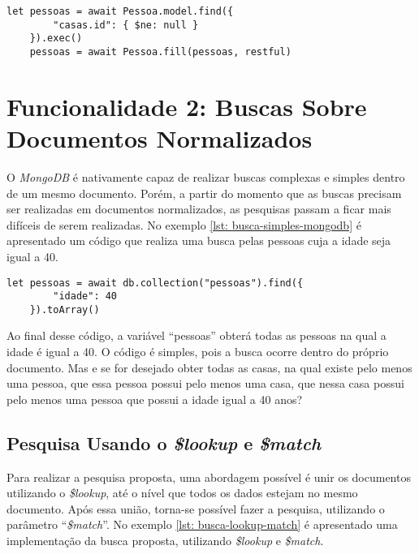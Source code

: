 \begin{lstlisting}[style=ES6, caption={\textit{inner join} de Documentos Com o \textit{Alpha Restful\label{lst: inner-join-alpha-restful}}}]
	let pessoas = await Pessoa.model.find({
	    "casas.id": { $ne: null }
	}).exec()
	pessoas = await Pessoa.fill(pessoas, restful)
\end{lstlisting}

\section{Funcionalidade 2: Buscas Sobre Documentos Normalizados\label{section: buscas-filtradas-documentos-relacionados}}

O \textit{MongoDB} é nativamente capaz de realizar buscas complexas e simples dentro de um mesmo documento. Porém, a partir do momento que as buscas precisam ser realizadas em documentos normalizados, as pesquisas passam a ficar mais difíceis de serem realizadas. No exemplo \ref{lst: busca-simples-mongodb} é apresentado um código que realiza uma busca pelas pessoas cuja a idade seja igual a 40.


\begin{lstlisting}[style=ES6, caption={Busca de Pessoas com Idade Igual a 40\label{lst: busca-simples-mongodb}}]
    let pessoas = await db.collection("pessoas").find({
        "idade": 40
    }).toArray()
\end{lstlisting}

Ao final desse código, a variável ``pessoas'' obterá todas as pessoas na qual a idade é igual a 40. O código é simples, pois a busca ocorre dentro do próprio documento. Mas e se for desejado obter todas as casas, na qual existe pelo menos uma pessoa, que essa pessoa possui pelo menos uma casa, que nessa casa possui pelo menos uma pessoa que possui a idade igual a 40 anos?

\subsection{Pesquisa Usando o \textit{\$lookup} e \textit{\$match}\label{subsection: pesquisa-lookup-match}}

Para realizar a pesquisa proposta, uma abordagem possível é unir os documentos utilizando o \textit{\$lookup}, até o nível que todos os dados estejam no mesmo documento. Após essa união, torna-se possível fazer a pesquisa, utilizando o parâmetro ``\textit{\$match}''. No exemplo \ref{lst: busca-lookup-match} é apresentado uma implementação da busca proposta, utilizando \textit{\$lookup} e \textit{\$match}.

